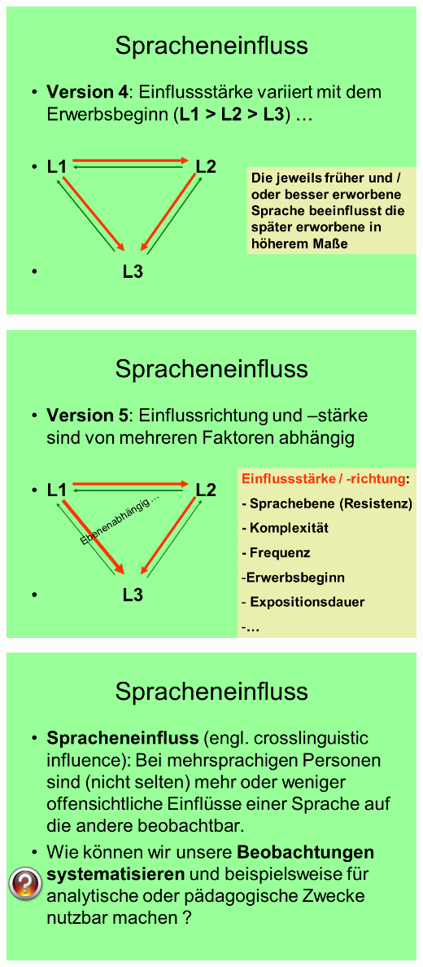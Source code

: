 \documentclass[
  letterpaper,
]{scrbook}
\begin{document}
\includegraphics[width=1\textwidth,height=\textheight]{./pictures/02_Spracheneinfluss_Sprachentrennung/Diapozitiv10.PNG}

\includegraphics[width=1\textwidth,height=\textheight]{./pictures/02_Spracheneinfluss_Sprachentrennung/Diapozitiv11.PNG}

\includegraphics[width=1\textwidth,height=\textheight]{./pictures/02_Spracheneinfluss_Sprachentrennung/Diapozitiv12.PNG}
\end{document}
